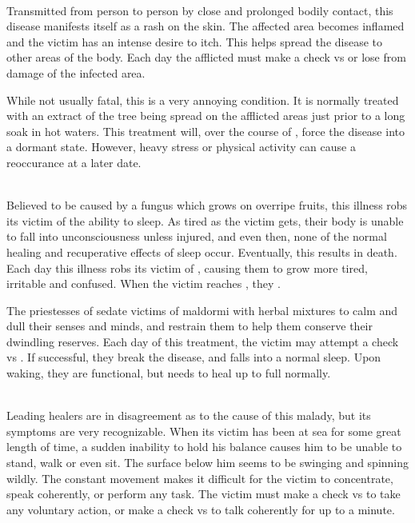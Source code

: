 \begin{multicols*}{2}
\\
Transmitted from person to person by close and prolonged bodily contact, this disease manifests itself as a rash on the skin. The affected area becomes inflamed and the victim has an intense desire to itch. This helps spread the disease to other areas of the body. Each day the afflicted must make a  check vs \WIL or lose  from damage of the infected area. 

While not usually fatal, this is a very annoying condition. It is normally treated with an extract of the  tree being spread on the afflicted areas just prior to a long soak in hot waters. This treatment will, over the course of , force the disease into a dormant state. However, heavy stress or physical activity can cause a reoccurance at a later date.

\\
Believed to be caused by a fungus which grows on overripe fruits, this illness robs its victim of the ability to sleep. As tired as the victim gets, their body is unable to fall into unconsciousness unless injured, and even then, none of the normal healing and recuperative effects of sleep occur. Eventually, this results in death. Each day this illness robs its victim of   \DP, causing them to grow more tired, irritable and confused. When the victim reaches , they .

The priestesses of  sedate victims of maldormi with herbal mixtures to calm and dull their senses and minds, and restrain them to help them conserve their dwindling reserves. Each day of this treatment, the victim may attempt a  check vs \HEA. If successful, they break the disease, and falls into a normal sleep. Upon waking, they are functional, but needs to heal up to full normally.

\\
Leading healers are in disagreement as to the cause of this malady, but its symptoms are very recognizable. When its victim has been at sea for some great length of time, a sudden inability to hold his balance causes him to be unable to stand, walk or even sit. The surface below him seems to be swinging and spinning wildly. The constant movement makes it difficult for the victim to concentrate, speak coherently, or perform any task. The victim must make a  check vs \WIL to take any voluntary action, or make a  check vs \WIL to talk coherently for up to a minute.


\end{multicols*}

